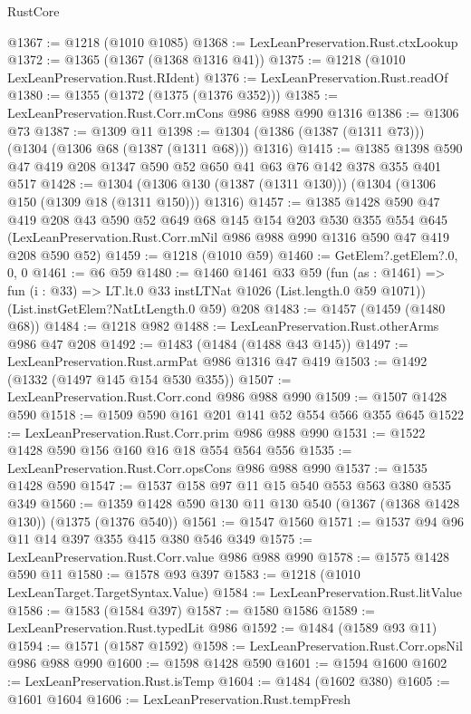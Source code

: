 \begin{lexlean}{RustCore}
\begin{coremodule}
@1367 := @1218 (@1010 @1085)
@1368 := LexLeanPreservation.Rust.ctxLookup
@1372 := @1365 (@1367 (@1368 @1316 @41))
@1375 := @1218 (@1010 LexLeanPreservation.Rust.RIdent)
@1376 := LexLeanPreservation.Rust.readOf
@1380 := @1355 (@1372 (@1375 (@1376 @352)))
@1385 := LexLeanPreservation.Rust.Corr.mCons @986 @988 @990 @1316
@1386 := @1306 @73
@1387 := @1309 @11
@1398 := @1304 (@1386 (@1387 (@1311 @73))) (@1304 (@1306 @68 (@1387 (@1311 @68))) @1316)
@1415 := @1385 @1398 @590 @47 @419 @208 @1347 @590 @52 @650 @41 @63 @76 @142 @378 @355 @401 @517
@1428 := @1304 (@1306 @130 (@1387 (@1311 @130))) (@1304 (@1306 @150 (@1309 @18 (@1311 @150))) @1316)
@1457 := @1385
    @1428
    @590
    @47
    @419
    @208
    @43
    @590
    @52
    @649
    @68
    @145
    @154
    @203
    @530
    @355
    @554
    @645
    (LexLeanPreservation.Rust.Corr.mNil @986 @988 @990 @1316 @590 @47 @419 @208 @590 @52)
@1459 := @1218 (@1010 @59)
@1460 := GetElem?.getElem?.{0, 0, 0}
@1461 := @6 @59
@1480 := @1460
    @1461
    @33
    @59
    (fun (as : @1461) => fun (i : @33) => LT.lt.{0} @33 instLTNat @1026 (List.length.{0} @59 @1071))
    (List.instGetElem?NatLtLength.{0} @59)
    @208
@1483 := @1457 (@1459 (@1480 @68))
@1484 := @1218 @982
@1488 := LexLeanPreservation.Rust.otherArms @986 @47 @208
@1492 := @1483 (@1484 (@1488 @43 @145))
@1497 := LexLeanPreservation.Rust.armPat @986 @1316 @47 @419
@1503 := @1492 (@1332 (@1497 @145 @154 @530 @355))
@1507 := LexLeanPreservation.Rust.Corr.cond @986 @988 @990
@1509 := @1507 @1428 @590
@1518 := @1509 @590 @161 @201 @141 @52 @554 @566 @355 @645
@1522 := LexLeanPreservation.Rust.Corr.prim @986 @988 @990
@1531 := @1522 @1428 @590 @156 @160 @16 @18 @554 @564 @556
@1535 := LexLeanPreservation.Rust.Corr.opsCons @986 @988 @990
@1537 := @1535 @1428 @590
@1547 := @1537 @158 @97 @11 @15 @540 @553 @563 @380 @535 @349
@1560 := @1359 @1428 @590 @130 @11 @130 @540 (@1367 (@1368 @1428 @130)) (@1375 (@1376 @540))
@1561 := @1547 @1560
@1571 := @1537 @94 @96 @11 @14 @397 @355 @415 @380 @546 @349
@1575 := LexLeanPreservation.Rust.Corr.value @986 @988 @990
@1578 := @1575 @1428 @590 @11
@1580 := @1578 @93 @397
@1583 := @1218 (@1010 LexLeanTarget.TargetSyntax.Value)
@1584 := LexLeanPreservation.Rust.litValue
@1586 := @1583 (@1584 @397)
@1587 := @1580 @1586
@1589 := LexLeanPreservation.Rust.typedLit @986
@1592 := @1484 (@1589 @93 @11)
@1594 := @1571 (@1587 @1592)
@1598 := LexLeanPreservation.Rust.Corr.opsNil @986 @988 @990
@1600 := @1598 @1428 @590
@1601 := @1594 @1600
@1602 := LexLeanPreservation.Rust.isTemp
@1604 := @1484 (@1602 @380)
@1605 := @1601 @1604
@1606 := LexLeanPreservation.Rust.tempFresh

\end{coremodule}
\end{lexlean}
